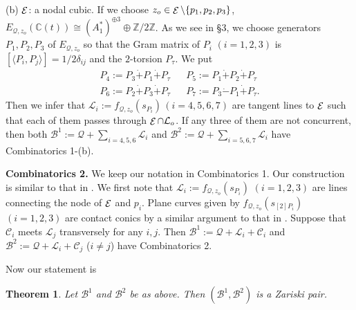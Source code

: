 \documentclass{article}
\newcommand{\ZZ}{\mathbb Z}
\newcommand{\CC}{\mathbb C}
\newcommand{\mcB}{\mathcal B}
\newcommand{\mcC}{\mathcal C}
\newcommand{\mcL}{\mathcal L}
\newcommand{\mcQ}{\mathcal Q}
\newcommand{\mcE}{\mathop {\cal E}\nolimits}
\newtheorem{thm}{Theorem}[section]
\begin{document}

(b) $\mcE$: a nodal cubic.   If we choose $z_o \in \mcE \setminus \{p_1, p_2, p_3\}$,
$E_{\mcQ, z_o}(\CC(t)) \cong (A_1^*)^{\oplus 3} \oplus \ZZ/2\ZZ$. As we see in \S 3, 
we choose generators  $P_1, P_2, P_3$  of $E_{\mcQ, z_o}$ so that the Gram matrix of
$P_i$ $(i = 1, 2, 3)$ is $[ \langle P_i, P_j \rangle ] = 1/2\delta_{ij}$  and the $2$-torsion $P_{\tau}$.  We put
\[
\begin{array}{ccc}
P_4  :=   P_3 \dot{+} P_1 \dot{+} P_\tau & &P_5  :=  P_1 \dot{+} P_2 \dot{+} P_\tau \\
P_6  :=  P_2 \dot{+} P_3 \dot{+} P_\tau  &  &P_7  :=  P_3 \dot{-} P_1 \dot{+} P_\tau .
\end{array}
\]
Then we infer that $\mcL_i:= f_{\mcQ, z_o}(s_{P_i})\, (i = 4, 5, 6, 7)$ are tangent lines to $\mcE$ such that each of them passes
 through $\mcE \cap \mcL_o$.  If any three of them are not concurrent, then
both $\mcB^1:= \mcQ + \sum_{i=4, 5, 6} \mcL_i$ and 
$\mcB^2:= \mcQ + \sum_{i= 5, 6, 7} \mcL_i$ have Combinatorics 1-(b).

 


{\bf Combinatorics 2.} We keep our notation in  Combinatorics 1.
Our construction is similar to that in \cite{tokunaga14}.  We first note that $\mcL_i := f_{\mcQ, z_o}(s_{P_i})$ $(i = 1, 2, 3)$ are lines
connecting the node of $\mcE$ and $p_i$.  Plane curves given by  $f_{\mcQ, z_o}(s_{[2]P_i})$  $(i = 1, 2, 3)$ are
contact conics by a similar argument to that in \cite[p. 633]{tokunaga14}.
Suppose that $\mcC_i$ meets $\mcL_j$  transversely for any $i, j$. 
Then $\mcB^1 := \mcQ + \mcL_i +  \mcC_i $ and $\mcB^2:= \mcQ + \mcL_i +  \mcC_j$ ($i \neq j$) have
Combinatorics 2.


\medskip

Now our statement is 

 
\begin{thm}\label{thm:comb-1}{Let $\mcB^1$ and $\mcB^2$ be as above. Then $(\mcB^1, \mcB^2)$ is a Zariski pair.}
\end{thm}
\end{document}
